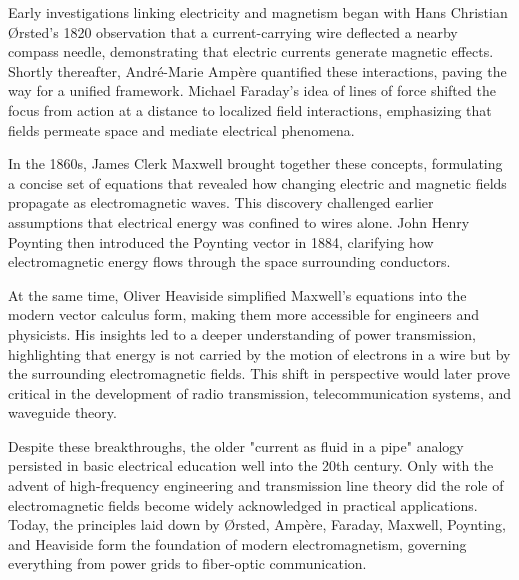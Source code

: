 \begin{historical}  
Early investigations linking electricity and magnetism began with Hans Christian Ørsted’s 1820 observation that a current-carrying wire deflected a nearby compass needle, demonstrating that electric currents generate magnetic effects. Shortly thereafter, André-Marie Ampère quantified these interactions, paving the way for a unified framework. Michael Faraday’s idea of lines of force shifted the focus from action at a distance to localized field interactions, emphasizing that fields permeate space and mediate electrical phenomena.  

In the 1860s, James Clerk Maxwell brought together these concepts, formulating a concise set of equations that revealed how changing electric and magnetic fields propagate as electromagnetic waves. This discovery challenged earlier assumptions that electrical energy was confined to wires alone. John Henry Poynting then introduced the Poynting vector in 1884, clarifying how electromagnetic energy flows through the space surrounding conductors.  

At the same time, Oliver Heaviside simplified Maxwell’s equations into the modern vector calculus form, making them more accessible for engineers and physicists. His insights led to a deeper understanding of power transmission, highlighting that energy is not carried by the motion of electrons in a wire but by the surrounding electromagnetic fields. This shift in perspective would later prove critical in the development of radio transmission, telecommunication systems, and waveguide theory.  

Despite these breakthroughs, the older "current as fluid in a pipe" analogy persisted in basic electrical education well into the 20th century. Only with the advent of high-frequency engineering and transmission line theory did the role of electromagnetic fields become widely acknowledged in practical applications. Today, the principles laid down by Ørsted, Ampère, Faraday, Maxwell, Poynting, and Heaviside form the foundation of modern electromagnetism, governing everything from power grids to fiber-optic communication.  
\end{historical}
